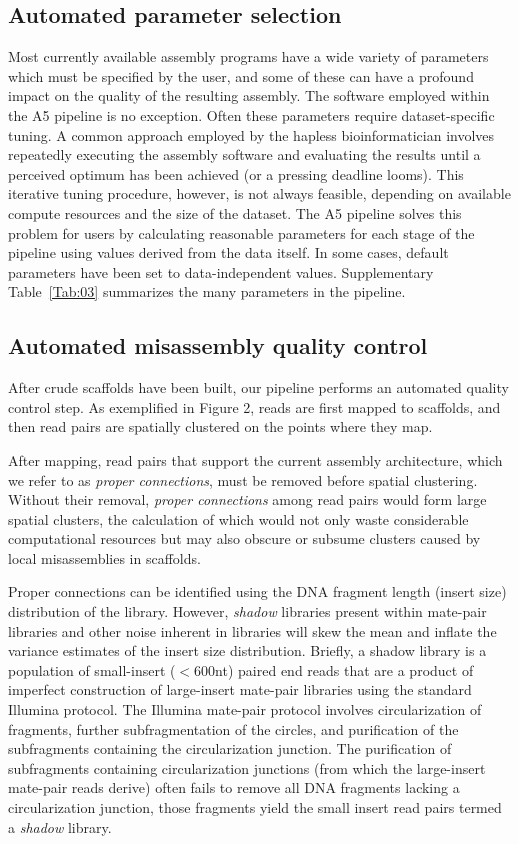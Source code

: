 \documentclass{bioinfo}
\begin{document}
\subsection{Automated parameter selection}

Most currently available assembly programs have a wide variety of parameters which must
be specified by the user, and some of these can have a profound impact on the quality of the 
resulting assembly. The software employed within the A5 pipeline is no exception. 
Often these parameters require dataset-specific tuning.  A common approach
employed by the hapless bioinformatician involves repeatedly
executing the assembly software and evaluating the results until a perceived 
optimum has been achieved (or a pressing deadline looms). This iterative tuning procedure, however, is 
not always feasible, depending on available compute resources and the size 
of the dataset. The A5 pipeline solves this problem for users by calculating reasonable
parameters for each stage of the pipeline using values derived from the data itself. In some
cases, default parameters have been set to data-independent values. Supplementary Table~\ref{Tab:03} 
summarizes the many parameters in the pipeline.

\subsection{Automated misassembly quality control}\label{sec:qc}

After crude scaffolds have been built, our pipeline performs an automated quality control step.
As exemplified in Figure 2, reads are first mapped to scaffolds, and then read pairs are spatially clustered on the
points where they map.

After mapping, read pairs that support the current assembly architecture, which we 
refer to as \emph{proper connections}, must be removed before spatial clustering. Without their removal, \emph{proper connections}
among read pairs would form large spatial clusters, the calculation of which would not only waste considerable 
computational resources but may also obscure or subsume clusters caused by local misassemblies in scaffolds. 

 Proper connections
can be identified using the DNA fragment length (insert size) distribution of the library. However, \emph{shadow} libraries present within 
mate-pair libraries and other noise inherent in libraries will skew the mean and inflate the variance 
estimates of the insert size distribution. Briefly, a shadow library is a population of small-insert ($<$600nt) paired end reads
that are a product of imperfect construction of large-insert
mate-pair libraries using the standard Illumina protocol. The Illumina mate-pair protocol involves circularization of fragments, further subfragmentation of the circles, and purification
of the subfragments containing the circularization junction. 
The purification of subfragments containing circularization junctions (from which the large-insert mate-pair reads derive) 
often fails to remove all DNA fragments lacking a circularization junction, those fragments yield the small insert
read pairs termed a \emph{shadow} library. 
\end{document}
